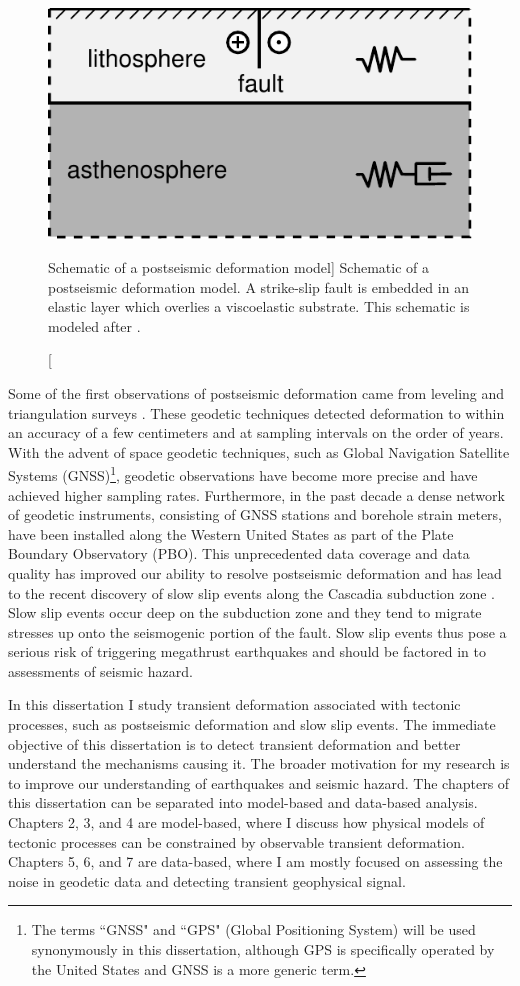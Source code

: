 \begin{figure}
\includegraphics{schematic}
\caption
[Schematic of a postseismic deformation model]
{Schematic of a postseismic deformation model. A strike-slip fault is
embedded in an elastic layer which overlies a viscoelastic substrate.
This schematic is modeled after \citep{Savage1978}.}
\label{intro:fig:1}
\end{figure}

Some of the first observations of postseismic deformation came from
leveling and triangulation surveys \citep[e.g,][]{Kanamori1973,
Thatcher1975}. These geodetic techniques detected deformation to
within an accuracy of a few centimeters and at sampling intervals on
the order of years. With the advent of space geodetic techniques, such
as Global Navigation Satellite Systems (GNSS)\footnote{The terms
``GNSS" and ``GPS" (Global Positioning System) will be used
synonymously in this dissertation, although GPS is specifically
operated by the United States and GNSS is a more generic term.},
geodetic observations have become more precise and have achieved
higher sampling rates. Furthermore, in the past decade a dense network
of geodetic instruments, consisting of GNSS stations and borehole
strain meters, have been installed along the Western United States as
part of the Plate Boundary Observatory (PBO). This unprecedented data
coverage and data quality has improved our ability to resolve
postseismic deformation and has lead to the recent discovery of slow
slip events along the Cascadia subduction zone \citep{Dragert2001}.
Slow slip events occur deep on the subduction zone and they tend to
migrate stresses up onto the seismogenic portion of the fault. Slow
slip events thus pose a serious risk of triggering megathrust
earthquakes and should be factored in to assessments of seismic
hazard.

In this dissertation I study transient deformation associated with
tectonic processes, such as postseismic deformation and slow slip
events. The immediate objective of this dissertation is to detect
transient deformation and better understand the mechanisms causing it.
The broader motivation for my research is to improve our understanding
of earthquakes and seismic hazard. The chapters of this dissertation
can be separated into model-based and data-based analysis. Chapters 2,
3, and 4 are model-based, where I discuss how physical models of
tectonic processes can be constrained by observable transient
deformation. Chapters 5, 6, and 7 are data-based, where I am mostly
focused on assessing the noise in geodetic data and detecting
transient geophysical signal.

